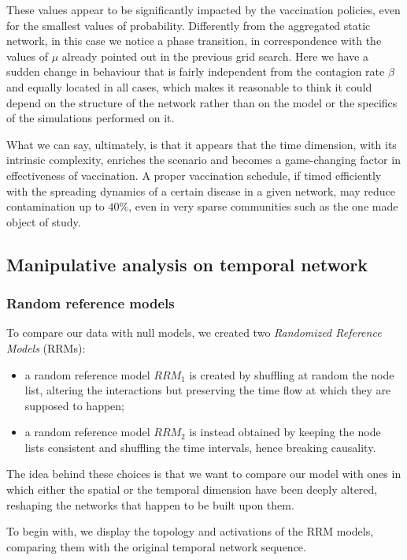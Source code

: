 \documentclass[a4paper,11pt, twocolumn]{article}
\begin{document}
These values appear to be significantly impacted by the vaccination policies, even for the smallest values of probability. Differently from the aggregated static network, in this case we notice a phase transition, in correspondence with the values of $\mu$ already pointed out in the previous grid search. Here we have a sudden change in behaviour that is fairly independent from the contagion rate $\beta$ and equally located in all cases, which makes it reasonable to think it could depend on the structure of the network rather than on the model or the specifics of the simulations performed on it.

What we can say, ultimately, is that it appears that the time dimension, with its intrinsic complexity, enriches the scenario and becomes a game-changing factor in effectiveness of vaccination. A proper vaccination schedule, if timed efficiently with the spreading dynamics of a certain disease in a given network, may reduce contamination up to $40\%$, even in very sparse communities such as the one made object of study.


\subsection{Manipulative analysis on temporal network}
\subsubsection*{Random reference models}
To compare our data with null models, we created two \emph{Randomized Reference Models} (RRMs):
\begin{itemize}
    \item a random reference model $RRM_1$ is created by shuffling at random the node list, altering the interactions but preserving the time flow at which they are supposed to happen;
    
    \item a random reference model $RRM_2$ is instead obtained by keeping the node lists consistent and shuffling the time intervals, hence breaking causality.
\end{itemize}

The idea behind these choices is that we want to compare our model with ones in which either the spatial or the temporal dimension have been deeply altered, reshaping the networks that happen to be built upon them.

To begin with, we display the topology and activations of the RRM models, comparing them with the original temporal network sequence.
\end{document}
